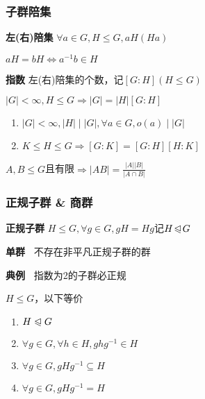 \documentclass[b4paper, 10pt]{ctexart}
\newcommand*{\impl}{\Rightarrow}
\renewcommand*{\iff}{\Leftrightarrow}
\renewcommand*{\leq}{\leqslant}
\newcommand*{\nmsubgroupeq}{\trianglelefteqslant}
\begin{document}
\begin{multicols}{3}
    \subsubsection{子群陪集}

    \textbf{左(右)陪集} $\forall a \!\in\! G, H \!\leq\! G, aH(Ha)$

    \begin{theorem}[陪集相等判则]
        $aH = bH \iff a^{-1}b \in H$
    \end{theorem}

    \textbf{指数} 左(右)陪集的个数，记$[G\!:\!H](H \!\leq\! G)$

    \begin{theorem}[Lagrange定理]
        $|G| \!\! < \!\! \infty, H \!\!\leq\!\! G \!\!\impl\!\! |G| \!\! = \!\! |H|[G\!:\!H]$
    \end{theorem}

    \begin{theorem}[指数性质]
        \hfil

        \begin{enumerate}
            \item $|G| < \infty, |H| \mid |G|, \forall a \in G, o(a) \mid |G|$
            \item $K \!\leq\! H \!\leq\! G \!\impl\! [G\!:\!K] \! = \! [G\!:\!H][H\!:\!K]$
        \end{enumerate}
    \end{theorem}

    \begin{theorem}[子群阶]
        $A, B \!\leq\! G$且有限$\impl |AB| = \frac{ |A| |B| }{ |A \cap B| }$
    \end{theorem}

    \subsubsection{正规子群 \& 商群}

    \textbf{正规子群} $H \!\!\leq\!\! G, \forall g \!\in\! G, gH \! = \! Hg$记$H \!\nmsubgroupeq\! G$

    \textbf{单群\ } 不存在非平凡正规子群的群

    \textbf{典例\ } 指数为2的子群必正规

    \begin{theorem}[正规子群判则]
        $H \leq G$，以下等价
        \begin{enumerate}
            \item $H \nmsubgroupeq G$
            \item $\forall g \in G,\forall h \in H, ghg^{-1} \in H$
            \item $\forall g \in G, gHg^{-1} \subseteq H$
            \item $\forall g \in G, gHg^{-1} = H$
        \end{enumerate}
    \end{theorem}


\end{multicols}
\end{document}
